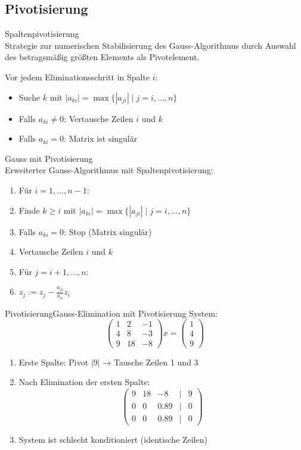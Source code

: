 \subsection{Pivotisierung}

\begin{concept}{Spaltenpivotisierung}\\
Strategie zur numerischen Stabilisierung des Gauss-Algorithmus durch Auswahl des betragsmäßig größten Elements als Pivotelement.

Vor jedem Eliminationsschritt in Spalte $i$:
\begin{itemize}
    \item Suche $k$ mit $|a_{ki}| = \max\{|a_{ji}| \mid j = i,\ldots,n\}$
    \item Falls $a_{ki} \neq 0$: Vertausche Zeilen $i$ und $k$
    \item Falls $a_{ki} = 0$: Matrix ist singulär
\end{itemize}
\end{concept}

\begin{KR}{Gauss mit Pivotisierung}\\
Erweiterter Gauss-Algorithmus mit Spaltenpivotisierung:
\begin{enumerate}
    \item Für $i=1,\ldots,n-1$:
    \item \quad Finde $k \geq i$ mit $|a_{ki}| = \max\{|a_{ji}| \mid j = i,\ldots,n\}$
    \item \quad Falls $a_{ki} = 0$: Stop (Matrix singulär)
    \item \quad Vertausche Zeilen $i$ und $k$
    \item \quad Für $j=i+1,\ldots,n$:
    \item \quad\quad $z_j := z_j - \frac{a_{ji}}{a_{ii}}z_i$
\end{enumerate}
\end{KR}

\begin{example2}{Pivotisierung}{Gauss-Elimination mit Pivotisierung}
System:
$$\begin{pmatrix}
1 & 2 & -1\\
4 & 8 & -3\\
9 & 18 & -8
\end{pmatrix}x = \begin{pmatrix}
1\\
4\\
9
\end{pmatrix}$$

\begin{enumerate}
    \item Erste Spalte: Pivot $|9|$ → Tausche Zeilen 1 und 3
    \item Nach Elimination der ersten Spalte:
    $$\begin{pmatrix}
    9 & 18 & -8 & | & 9\\
    0 & 0 & 0.89 & | & 0\\
    0 & 0 & 0.89 & | & 0
    \end{pmatrix}$$
    \item System ist schlecht konditioniert (identische Zeilen)
\end{enumerate}
\end{example2}

